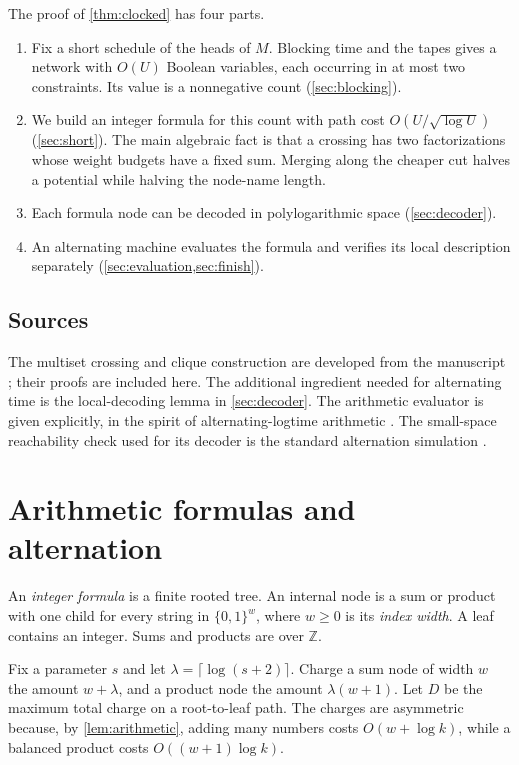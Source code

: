 \documentclass[11pt]{article}
\theoremstyle{definition}
\theoremstyle{remark}
\newcommand{\Z}{\mathbb Z}
\begin{document}
The proof of \cref{thm:clocked} has four parts.
\begin{enumerate}[label=(\arabic*)]
\item Fix a short schedule of the heads of $M$. Blocking time and the tapes gives a network with $O(U)$ Boolean variables, each occurring in at most two constraints. Its value is a nonnegative count (\cref{sec:blocking}).
\item We build an integer formula for this count with path cost $O(U/\sqrt{\log U})$ (\cref{sec:short}). The main algebraic fact is that a crossing has two factorizations whose weight budgets have a fixed sum. Merging along the cheaper cut halves a potential while halving the node-name length.
\item Each formula node can be decoded in polylogarithmic space (\cref{sec:decoder}).
\item An alternating machine evaluates the formula and verifies its local description separately (\cref{sec:evaluation,sec:finish}).
\end{enumerate}

\subsection{Sources}

The multiset crossing and clique construction are developed from the manuscript \cite{Cruz26}; their proofs are included here. The additional ingredient needed for alternating time is the local-decoding lemma in \cref{sec:decoder}. The arithmetic evaluator is given explicitly, in the spirit of alternating-logtime arithmetic \cite{Buss87}. The small-space reachability check used for its decoder is the standard alternation simulation \cite{CKS81}.

\section{Arithmetic formulas and alternation}\label{sec:evaluation}

An \emph{integer formula} is a finite rooted tree. An internal node is a sum or product with one child for every string in $\{0,1\}^w$, where $w\ge0$ is its \emph{index width}. A leaf contains an integer. Sums and products are over $\Z$.

Fix a parameter $s$ and let $\lambda=\lceil\log(s+2)\rceil$. Charge a sum node of width $w$ the amount $w+\lambda$, and a product node the amount $\lambda(w+1)$. Let $D$ be the maximum total charge on a root-to-leaf path. The charges are asymmetric because, by \cref{lem:arithmetic}, adding many numbers costs $O(w+\log k)$, while a balanced product costs $O((w+1)\log k)$.
\end{document}

